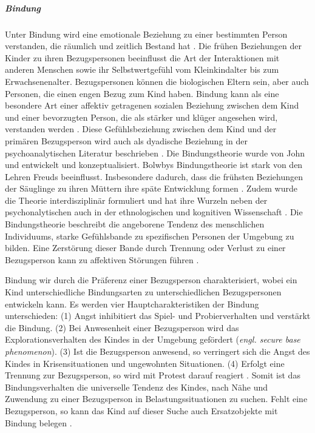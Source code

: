 \subparagraph{Bindung}\label{par:Bindung}
Unter Bindung wird eine emotionale Beziehung zu einer bestimmten Person verstanden, die räumlich und zeitlich Bestand hat \cite[S.~585ff]{Siegler2008}. Die frühen Beziehungen der Kinder zu ihren Bezugspersonen beeinflusst die Art der Interaktionen mit anderen Menschen sowie ihr Selbstwertgefühl vom Kleinkindalter bis zum Erwachsenenalter. Bezugspersonen können die biologischen Eltern sein, aber auch Personen, die einen engen Bezug zum Kind haben. Bindung kann als eine besondere Art einer affektiv getragenen sozialen Beziehung zwischen dem Kind und einer bevorzugten Person, die als stärker und klüger angesehen wird, verstanden werden \cite{Biringen1994}. Diese Gefühlsbeziehung zwischen dem Kind und der primären Bezugsperson wird auch als dyadische Beziehung in der psychoanalytischen Literatur beschrieben \cite{Resch1999}. Die Bindungstheorie wurde von John  und  entwickelt und konzeptualisiert. Bolwbys Bindungstheorie ist stark von den Lehren Freuds beeinflusst. Insbesondere dadurch, dass die frühsten Beziehungen der Säuglinge zu ihren Müttern ihre späte Entwicklung formen \cite{Siegler2008}. Zudem wurde die Theorie interdisziplinär formuliert und hat ihre Wurzeln neben der psychonalytischen auch in der ethnologischen und kognitiven Wissenschaft \cite{Resch1999}. Die Bindungstheorie beschreibt die angeborene Tendenz des menschlichen Individuums, starke Gefühlsbande zu spezifischen Personen der Umgebung zu bilden. Eine Zerstörung dieser Bande durch Trennung oder Verlust zu einer Bezugsperson kann zu affektiven Störungen führen \cite{Resch1999}. 

Bindung wir durch die Präferenz einer Bezugsperson charakterisiert, wobei ein Kind unterschiedliche Bindungsarten zu unterschiedlichen Bezugspersonen entwickeln kann. Es werden vier Hauptcharakteristiken der Bindung unterschieden: (1) Angst inhibitiert das Spiel- und Probierverhalten und verstärkt die Bindung. (2) Bei Anwesenheit einer Bezugsperson wird das Explorationsverhalten des Kindes in der Umgebung gefördert (\textit{engl. secure base phenomenon}). (3) Ist die Bezugsperson anwesend, so verringert sich die Angst des Kindes in Krisensituationen und ungewohnten Situationen. (4) Erfolgt eine Trennung zur Bezugsperson, so wird mit Protest darauf reagiert \cite{Resch1999}. Somit ist das Bindungsverhalten die universelle Tendenz des Kindes, nach Nähe und Zuwendung zu einer Bezugsperson in Belastungssituationen zu suchen. Fehlt eine Bezugsperson, so kann das Kind auf dieser Suche auch Ersatzobjekte mit Bindung belegen \cite{Resch1999}.

